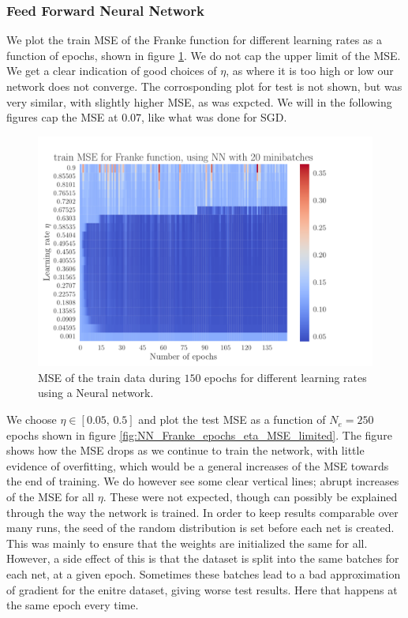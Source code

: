\documentclass[12pt]{extarticle}
\begin{document}
\subsubsection{Feed Forward Neural Network}

We plot the train MSE of the Franke function for different learning rates as a function of epochs, shown in figure \ref{fig:NN_Franke_epochs_eta_MSE}. We do not cap the upper limit of the MSE. We get a clear indication of good choices of $\eta$, as where it is too high or low our network does not converge. The corrosponding plot for test is not shown, but was very similar, with slightly higher MSE, as was expcted. We will in the following figures cap the MSE at $0.07$, like what was done for SGD.

\begin{figure}[h!]
	\includegraphics[width=\linewidth]{NN_Franke/NN_Franke__epochs_eta__train_MSE__569887.pdf}
	\caption{MSE of the train data during $150$ epochs for different learning rates using a Neural network.}
	\label{fig:NN_Franke_epochs_eta_MSE}
\end{figure}


We choose $\eta\in[0.05,\,0.5]$ and plot the test MSE as a function of $N_e=250$ epochs shown in figure \ref{fig:NN_Franke_epochs_eta_MSE_limited}. The figure shows how the MSE drops as we continue to train the network, with little evidence of overfitting, which would be a general increases of the MSE towards the end of training. We do however see some clear vertical lines; abrupt increases of the MSE for all $\eta$. These were not expected, though can possibly be explained through the way the network is trained. In order to keep results comparable over many runs, the seed of the random distribution is set before each net is created. This was mainly to ensure that the weights are initialized the same for all. However, a side effect of this is that the dataset is split into the same batches for each net, at a given epoch. Sometimes these batches lead to a bad approximation of gradient for the enitre dataset, giving worse test results. Here that happens at the same epoch every time.
\end{document}
